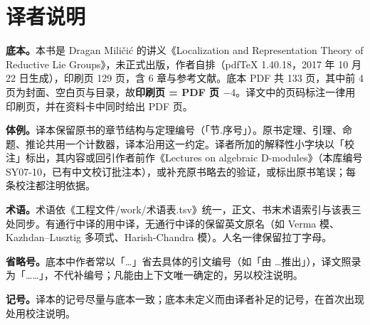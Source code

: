\chapter*{译者说明}

\textbf{底本。}本书是 Dragan Miličić 的讲义《Localization and Representation Theory of Reductive Lie Groups》，未正式出版，作者自排（pdf\TeX{} 1.40.18，2017 年 10 月 22 日生成），印刷页 129 页，含 6 章与参考文献。底本 PDF 共 133 页，其中前 4 页为封面、空白页与目录，故\textbf{印刷页 = PDF 页 $-4$}。译文中的页码标注一律用印刷页，并在资料卡中同时给出 PDF 页。

\textbf{体例。}译本保留原书的章节结构与定理编号（「节.序号」）。原书定理、引理、命题、推论共用一个计数器，译本沿用这一约定。译者所加的解释性小字块以「校注」标出，其内容或回引作者前作《Lectures on algebraic D-modules》（本库编号 SY07-10，已有中文校订批注本），或补充原书略去的验证，或标出原书笔误；每条校注都注明依据。

\textbf{术语。}术语依《工程文件/work/术语表.tsv》统一，正文、书末术语索引与该表三处同步。有通行中译的用中译，无通行中译的保留英文原名（如 Verma 模、Kazhdan--Lusztig 多项式、Harish-Chandra 模）。人名一律保留拉丁字母。

\textbf{省略号。}底本中作者常以「\dots」省去具体的引文编号（如「由 \dots 推出」），译文照录为「\dots\dots」，不代补编号；凡能由上下文唯一确定的，另以校注说明。

\textbf{记号。}译本的记号尽量与底本一致；底本未定义而由译者补足的记号，在首次出现处用校注说明。
